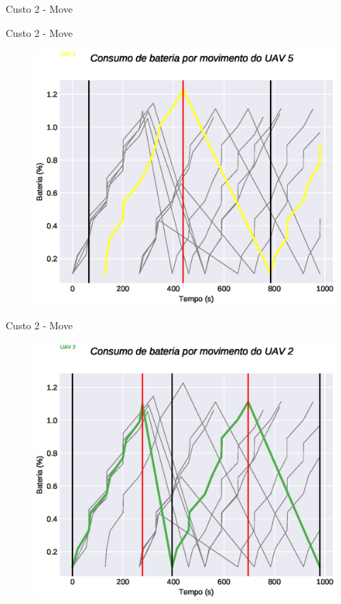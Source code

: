 \begin{frame}{Custo 2 - Move}
\begin{figure}[!htb]
                 \end{figure}
            \end{frame}\begin{frame}{Custo 2 - Move}
                \begin{figure}[!htb]
                     \includegraphics[width=\textwidth]{custo_2/uav_move_acum_uav_5.eps}
                 \end{figure}
            \end{frame}\begin{frame}{Custo 2 - Move}
                \begin{figure}[!htb]
                     \includegraphics[width=\textwidth]{custo_2/uav_move_acum_uav_2.eps}

\end{figure}
\end{frame}
